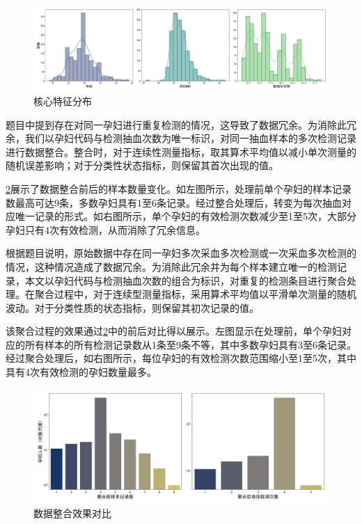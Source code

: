\begin{figure}[h!]
\centering
\includegraphics[width=1\textwidth]{figs/2模型准备/图1_核心特征分布.png}
\caption{核心特征分布}
\label{fig:核心特征分布}
\end{figure}

题目中提到存在对同一孕妇进行重复检测的情况，这导致了数据冗余。为消除此冗余，我们以孕妇代码与检测抽血次数为唯一标识，对同一抽血样本的多次检测记录进行数据整合。整合时，对于连续性测量指标，取其算术平均值以减小单次测量的随机误差影响；对于分类性状态指标，则保留其首次出现的值。

\cref{fig:整合效果对比}展示了数据整合前后的样本数量变化。如左图所示，处理前单个孕妇的样本记录数最高可达9条，多数孕妇具有1至6条记录。经过整合处理后，转变为每次抽血对应唯一记录的形式。如右图所示，单个孕妇的有效检测次数减少至1至5次，大部分孕妇只有4次有效检测，从而消除了冗余信息。

根据题目说明，原始数据中存在同一孕妇多次采血多次检测或一次采血多次检测的情况，这种情况造成了数据冗余。为消除此冗余并为每个样本建立唯一的检测记录，本文以孕妇代码与检测抽血次数的组合为标识，对重复的检测条目进行聚合处理。在聚合过程中，对于连续型测量指标，采用算术平均值以平滑单次测量的随机波动。对于分类性质的状态指标，则保留其初次记录的值。

该聚合过程的效果通过\cref{fig:整合效果对比}中的前后对比得以展示。左图显示在处理前，单个孕妇对应的所有样本的所有检测记录数从1条至9条不等，其中多数孕妇具有3至6条记录。经过聚合处理后，如右图所示，每位孕妇的有效检测次数范围缩小至1至5次，其中具有4次有效检测的孕妇数量最多。


\begin{figure}[h!]
    \centering
    \includegraphics[width=1\textwidth]{figs/2模型准备/图2_聚合效果对比.png}
    \caption{数据整合效果对比}
    \label{fig:整合效果对比}
\end{figure}

